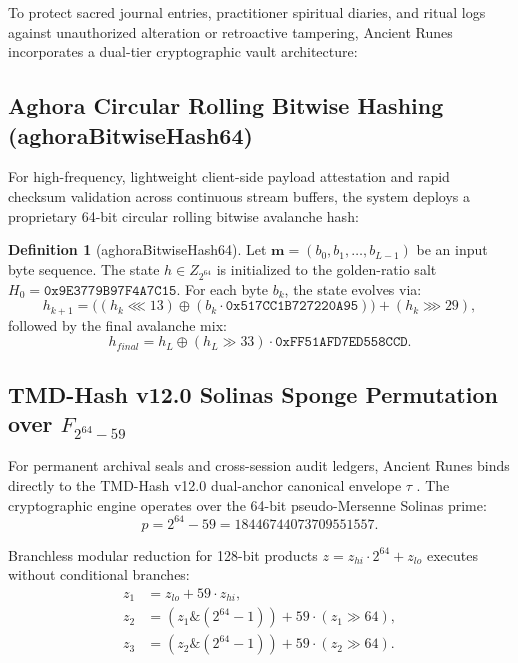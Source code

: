 \documentclass[11pt,a4paper,reqno]{article}
\def\texttt#1{#1}%
\def\mathrm#1{#1}%
\def\mathbb#1{#1}%
\theoremstyle{plain}
\theoremstyle{definition}
\newtheorem{definition}[theorem]{Definition}
\theoremstyle{remark}
\numberwithin{equation}{section}
\begin{document}
To protect sacred journal entries, practitioner spiritual diaries, and ritual logs against unauthorized alteration or retroactive tampering, Ancient Runes incorporates a dual-tier cryptographic vault architecture:

\subsection{\texorpdfstring{Aghora Circular Rolling Bitwise Hashing (\texttt{aghoraBitwiseHash64})}{Aghora Circular Rolling Bitwise Hashing}}
For high-frequency, lightweight client-side payload attestation and rapid checksum validation across continuous stream buffers, the system deploys a proprietary 64-bit circular rolling bitwise avalanche hash:
\begin{definition}[{\texttt{aghoraBitwiseHash64}}]
Let $\mathbf{m} = (b_0, b_1, \dots, b_{L-1})$ be an input byte sequence. The state $h \in \mathbb{Z}_{2^{64}}$ is initialized to the golden-ratio salt $H_0 = \mathtt{0x9E3779B97F4A7C15}$. For each byte $b_k$, the state evolves via:
\begin{equation}
\label{eq:aghora_bitwise_step}
h_{k+1} = \Big( (h_k \lll 13) \oplus (b_k \cdot \mathtt{0x517CC1B727220A95}) \Big) + (h_k \ggg 29),
\end{equation}
followed by the final avalanche mix:
\begin{equation}
\label{eq:aghora_avalanche}
h_{\mathrm{final}} = h_L \oplus (h_L \gg 33) \cdot \mathtt{0xFF51AFD7ED558CCD}.
\end{equation}
\end{definition}

\subsection{\texorpdfstring{TMD-Hash v12.0 Solinas Sponge Permutation over $\mathbb{F}_{2^{64}-59}$}{TMD-Hash v12.0 Solinas Sponge Permutation over F(2^64-59)}}
For permanent archival seals and cross-session audit ledgers, Ancient Runes binds directly to the TMD-Hash v12.0 dual-anchor canonical envelope $\tau$ \cite{tmd12zenodo}. The cryptographic engine operates over the 64-bit pseudo-Mersenne Solinas prime:
\begin{equation}
\label{eq:solinas_prime_runes}
p = 2^{64} - 59 = 18446744073709551557.
\end{equation}

Branchless modular reduction for 128-bit products $z = z_{\mathrm{hi}} \cdot 2^{64} + z_{\mathrm{lo}}$ executes without conditional branches:
\begin{equation}
\label{eq:solinas_reduction_runes}
\begin{aligned}
z_1 &= z_{\mathrm{lo}} + 59 \cdot z_{\mathrm{hi}}, \\
z_2 &= (z_1 \mathbin{\&} (2^{64}-1)) + 59 \cdot (z_1 \gg 64), \\
z_3 &= (z_2 \mathbin{\&} (2^{64}-1)) + 59 \cdot (z_2 \gg 64).
\end{aligned}
\end{equation}
\end{document}
